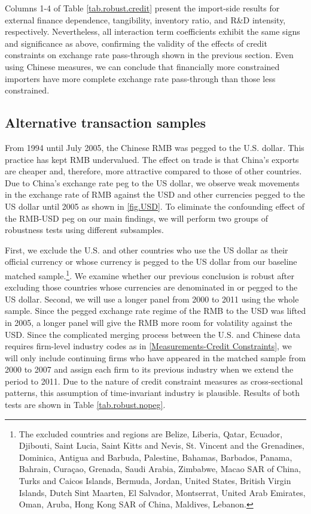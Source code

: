 \documentclass[12pt]{article}
\begin{document}
Columns 1-4 of Table \ref{tab.robust.credit} present the import-side results for external finance dependence, tangibility, inventory ratio, and R\&D intensity, respectively. Nevertheless, all interaction term coefficients exhibit the same signs and significance as above, confirming the validity of the effects of credit constraints on exchange rate pass-through shown in the previous section. Even using Chinese measures, we can conclude that financially more constrained importers have more complete exchange rate pass-through than those less constrained.

\subsection{Alternative transaction samples}

From 1994 until July 2005, the Chinese RMB was pegged to the U.S. dollar. This practice has kept RMB undervalued. The effect on trade is that China's exports are cheaper and, therefore, more attractive compared to those of other countries. Due to China's exchange rate peg to the US dollar, we observe weak movements in the exchange rate of RMB against the USD and other currencies pegged to the US dollar until 2005 as shown in \ref{fig.USD}. To eliminate the confounding effect of the RMB-USD peg on our main findings, we will perform two groups of robustness tests using different subsamples.

First, we exclude the U.S. and other countries who use the US dollar as their official currency or whose currency is pegged to the US dollar from our baseline matched sample.\footnote{The excluded countries and regions are Belize, Liberia, Qatar, Ecuador, Djibouti, Saint Lucia, Saint Kitts and Nevis, St. Vincent and the Grenadines, Dominica, Antigua and Barbuda, Palestine, Bahamas, Barbados, Panama, Bahrain, Curaçao, Grenada, Saudi Arabia, Zimbabwe, Macao SAR of China, Turks and Caicos Islands, Bermuda, Jordan, United States, British Virgin Islands, Dutch Sint Maarten, El Salvador, Montserrat, United Arab Emirates, Oman, Aruba, Hong Kong SAR of China, Maldives, Lebanon.}. We examine whether our previous conclusion is robust after excluding those countries whose currencies are denominated in or pegged to the US dollar. Second, we will use a longer panel from 2000 to 2011 using the whole sample. Since the pegged exchange rate regime of the RMB to the USD was lifted in 2005, a longer panel will give the RMB more room for volatility against the USD. Since the complicated merging process between the U.S. and Chinese data requires firm-level industry codes as in \ref{Measurements-Credit Constraints}, we will only include continuing firms who have appeared in the matched sample from 2000 to 2007  and assign each firm to its previous industry when we extend the period to 2011. Due to the nature of credit constraint measures as cross-sectional patterns, this assumption of time-invariant industry is plausible. Results of both tests are shown in Table \ref{tab.robust.nopeg}.
\end{document}

